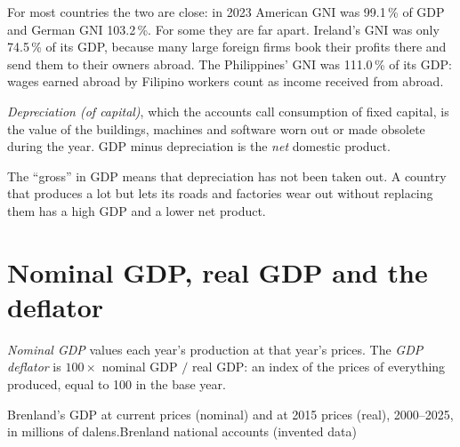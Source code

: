 For most countries the two are close: in 2023 American GNI was 99.1\,\% of GDP and German GNI 103.2\,\%. For some they are far apart. Ireland's GNI was only
74.5\,\% of its GDP, because many large foreign firms book their profits there and send them to their owners abroad. The Philippines' GNI was 111.0\,\% of its
GDP: wages earned abroad by Filipino workers count as income received from abroad.

\begin{definition}\label{def:g10:national-accounts:depreciation}
\emph{Depreciation (of capital)}, which the accounts call consumption of fixed capital, is the value of the buildings, machines
and software worn out or made obsolete during the year. GDP minus depreciation is the \emph{net} domestic product.
\end{definition}

The ``gross'' in GDP means that depreciation has not been taken out. A country that produces a lot but lets its roads and factories wear out without replacing
them has a high GDP and a lower net product.

\section{Nominal GDP, real GDP and the deflator}\label{sec:g10:national-accounts:deflator}

\begin{definition}\label{def:g10:national-accounts:nominal-gdp}
\emph{Nominal GDP} values each year's production at that year's prices. The \emph{GDP deflator} is $100 \times$ nominal GDP
$/$ real GDP: an index of the prices of everything produced, equal to 100 in the base year.
\end{definition}
\label{def:g10:national-accounts:deflator}

\begin{omchart}{Brenland's GDP at current prices (nominal) and at 2015 prices (real), 2000--2025, in millions of dalens.}{Brenland national accounts (invented
data)}
\end{omchart}

